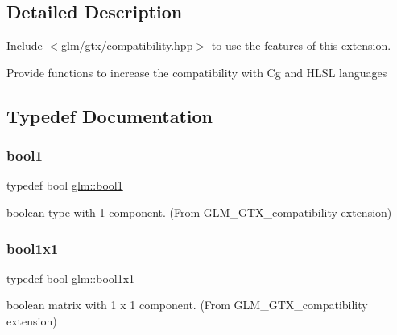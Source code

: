 \subsection{Detailed Description}
Include $<$\mbox{\hyperlink{compatibility_8hpp}{glm/gtx/compatibility.\+hpp}}$>$ to use the features of this extension.

Provide functions to increase the compatibility with Cg and H\+L\+SL languages 

\subsection{Typedef Documentation}
\mbox{\label{group__gtx__compatibility_gab65f19f5170f95a2f06d6aa6482c9405}} 
\subsubsection{\texorpdfstring{bool1}{bool1}}
{\footnotesize\ttfamily typedef bool \mbox{\hyperlink{group__gtx__compatibility_gab65f19f5170f95a2f06d6aa6482c9405}{glm\+::bool1}}}



boolean type with 1 component. (From G\+L\+M\+\_\+\+G\+T\+X\+\_\+compatibility extension) 

\mbox{\label{group__gtx__compatibility_ga98d9d3da22aebc872ba38ce5afa0eff7}} 
\subsubsection{\texorpdfstring{bool1x1}{bool1x1}}
{\footnotesize\ttfamily typedef bool \mbox{\hyperlink{group__gtx__compatibility_ga98d9d3da22aebc872ba38ce5afa0eff7}{glm\+::bool1x1}}}



boolean matrix with 1 x 1 component. (From G\+L\+M\+\_\+\+G\+T\+X\+\_\+compatibility extension) 

\mbox{\label{group__gtx__compatibility_ga19e8114c90e2c81cfa87db72f4020b52}} 
